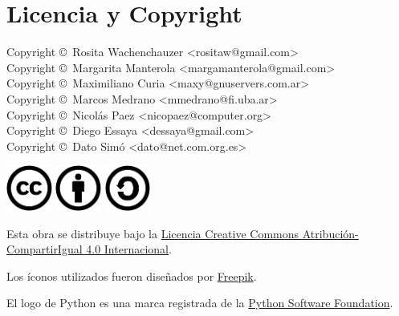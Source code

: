 
\chapter*{Licencia y Copyright}

{\noindent
Copyright \copyright\ Rosita Wachenchauzer <rositaw@gmail.com> \\
Copyright \copyright\ Margarita Manterola <margamanterola@gmail.com> \\
Copyright \copyright\ Maximiliano Curia <maxy@gnuservers.com.ar> \\
Copyright \copyright\ Marcos Medrano <mmedrano@fi.uba.ar> \\
Copyright \copyright\ Nicolás Paez <nicopaez@computer.org> \\
Copyright \copyright\ Diego Essaya <dessaya@gmail.com> \\
Copyright \copyright\ Dato Simó <dato@net.com.org.es> \\
}

\begin{center}
\noindent
\includegraphics[height=1.5cm]{graficos/cc/cc}
\hspace{0.5cm}
\includegraphics[height=1.5cm]{graficos/cc/by}
\hspace{0.5cm}
\includegraphics[height=1.5cm]{graficos/cc/sa}
\end{center}

Esta obra se distribuye bajo la
\href{http://creativecommons.org/licenses/by-sa/4.0/deed.es}{Licencia Creative
Commons Atribución-CompartirIgual 4.0 Internacional}.

Los íconos utilizados fueron diseñados por
\href{http://www.freepik.com/}{Freepik}.

El logo de Python es una marca registrada de la
\href{https://www.python.org/psf/}{Python Software Foundation}.

